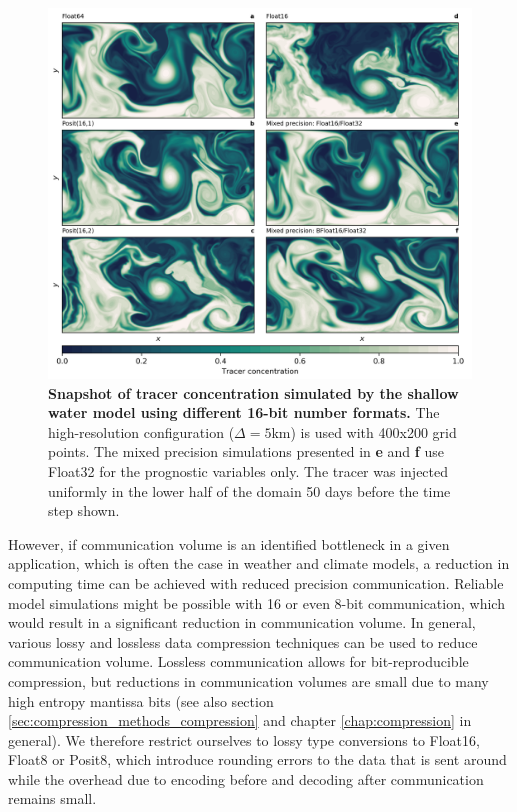 \begin{figure}[htbp]
\includegraphics[width=1\textwidth]{Figures/swm/snapshot.png}
\caption{\textbf{Snapshot of tracer concentration simulated by the shallow water model using different 16-bit number formats.}
The high-resolution configuration ($\Delta = 5$km) is used with 400x200 grid points. The mixed precision simulations presented
in \textbf{e} and \textbf{f} use Float32 for the prognostic variables only. The tracer was injected uniformly in the lower half of the
domain 50 days before the time step shown.}
\label{fig:snapshot}
\end{figure}

However, if communication volume is an identified bottleneck in a given application, which is often the case in weather and
climate models, a reduction in computing time can be achieved with reduced precision communication. Reliable model simulations
might be possible with 16 or even 8-bit communication, which would result in a significant reduction in communication volume.
In general, various lossy and lossless data compression techniques can be used to reduce communication volume. Lossless
communication allows for bit-reproducible compression, but reductions in communication volumes are small due to many
high entropy mantissa bits (see also section \ref{sec:compression_methods_compression} and chapter
\ref{chap:compression} in general). We therefore restrict ourselves to lossy type conversions to Float16, Float8 or Posit8,
which introduce rounding errors to the data that is sent around while the overhead due to encoding before and decoding
after communication remains small.

